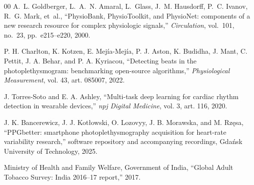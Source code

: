 \documentclass[conference]{IEEEtran}
\begin{document}
\begin{thebibliography}{00}
A.~L. Goldberger, L.~A.~N. Amaral, L.~Glass, J.~M. Hausdorff, P.~C. Ivanov,
R.~G. Mark, et~al.,
``PhysioBank, PhysioToolkit, and PhysioNet: components of a new research resource
for complex physiologic signals,''
\emph{Circulation}, vol.~101, no.~23, pp.~e215--e220, 2000.

P. H. Charlton, K. Kotzen, E. Mej\'{i}a-Mej\'{i}a, P. J. Aston, K. Budidha, J. Mant,
C. Pettit, J. A. Behar, and P. A. Kyriacou, ``Detecting beats in the photoplethysmogram:
benchmarking open-source algorithms,'' \emph{Physiological Measurement}, vol. 43, art.
085007, 2022.

J. Torres-Soto and E. A. Ashley, ``Multi-task deep learning for cardiac rhythm detection
in wearable devices,'' \emph{npj Digital Medicine}, vol. 3, art. 116, 2020.

J. K. Bancerewicz, J. J. Kot\l{}owski, O. Lozovyy, J. B. Morawska, and M. Rz\k{e}sa,
``PPGbetter: smartphone photoplethysmography acquisition for heart-rate variability
research,'' software repository and accompanying recordings, Gda\'{n}sk University of
Technology, 2025.

Ministry of Health and Family Welfare, Government of India,
``Global Adult Tobacco Survey: India 2016--17 report,'' 2017.

\end{thebibliography}
\end{document}
